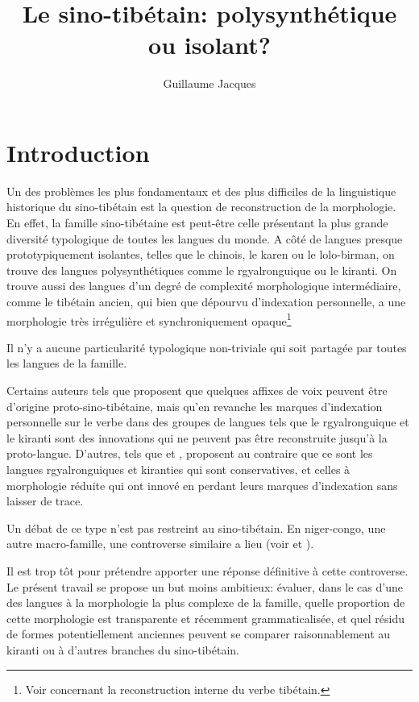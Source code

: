 \documentclass[oldfontcommands,oneside,a4paper,11pt]{article}
\begin{document}
 
\title{Le sino-tibétain: polysynthétique ou isolant?  }
\author{Guillaume Jacques}
\maketitle
\linenumbers

\section{Introduction}
Un des problèmes les plus fondamentaux et des plus difficiles de la linguistique historique du sino-tibétain est la question de reconstruction de la morphologie. En effet, la famille sino-tibétaine est peut-être celle présentant la plus grande diversité typologique de toutes les langues du monde. A côté de langues presque prototypiquement isolantes, telles que le chinois, le karen ou le lolo-birman, on trouve des langues polysynthétiques comme le rgyalronguique ou le kiranti. On trouve aussi des langues d'un degré de complexité morphologique intermédiaire, comme le tibétain ancien, qui bien que dépourvu d'indexation personnelle, a une morphologie très irrégulière et synchroniquement opaque\footnote{Voir \citet{hill05vbri, jacques10ndr, jacques12internal, hill14dempsey, hill14voicing, hill15lan} concernant la reconstruction interne du verbe tibétain.}

 


 Il n'y a aucune particularité typologique non-triviale qui soit partagée par toutes les langues de la famille. 

Certains auteurs tels que  \citet{lapolla03} proposent que quelques affixes de voix peuvent être d'origine proto-sino-tibétaine, mais qu'en revanche les marques d'indexation personnelle sur le verbe dans des groupes de langues tels que le rgyalronguique et le kiranti sont des innovations qui ne peuvent pas être reconstruite jusqu'à la proto-langue. D'autres, tels que  \citet{driem93agreement}  et \citet{delancey10agreement}, proposent au contraire que ce sont les langues rgyalronguiques et kiranties qui sont conservatives, et celles à morphologie réduite qui ont innové en perdant leurs marques d'indexation sans laisser de trace.


Un débat de ce type n'est pas restreint au sino-tibétain. En niger-congo, une autre macro-famille, une controverse similaire a lieu (voir  \citealt{guldeman08macrosudan} et  \citealt{hyman11macrosudan}). 

Il est trop tôt pour prétendre apporter une réponse définitive à cette controverse. Le présent travail se propose un but moins ambitieux: évaluer, dans le cas d'une des langues à la morphologie la plus complexe de la famille, quelle proportion de cette morphologie est transparente et récemment grammaticalisée, et quel résidu de formes potentiellement anciennes peuvent se comparer raisonnablement au kiranti ou à d'autres branches du sino-tibétain. 
\end{document}
